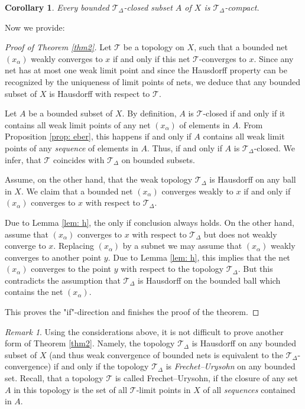 \documentclass[12pt,leqno]{amsart}
\numberwithin{equation}{section}
\newtheorem{cor}[thm]{Corollary}
\theoremstyle{remark}
\newtheorem{rem}[thm]{Remark}
\begin{document}
\begin{cor} \label{prop: comp}
	Every bounded $\mathcal T_{\Delta}$-closed subset $A$ of $X$ is $\mathcal T_{\Delta}$-compact. 	
\end{cor}

Now we provide:
\begin{proof}[Proof of Theorem \ref{thm2}]
	Let $\mathcal T$ be a topology on $X$, such that a bounded net $(x_{\alpha})$ weakly converges to $x$ if and only if this net $\mathcal T$-converges to $x$. Since any net has at most one weak limit point and since the Hausdorff property can be recognized by the uniqueness of limit points of nets, we deduce that any bounded subset of $X$ is Hausdorff with respect to $\mathcal T$. 
	
	 Let $A$ be a bounded subset of $X$. By definition, $A$ is $\mathcal T$-closed if and only if it contains all weak limit points of any net $(x_{\alpha})$ of elements in $A$. From 
	 Proposition \ref{prop: eber}, this happens if and only if $A$ contains all weak limit points of any \emph{sequence} of elements in $A$. Thus, if and only if $A$ is $\mathcal T_{\Delta}$-closed. We infer, that $\mathcal T$ coincides with $\mathcal T_{\Delta}$ on bounded subsets. 
	
	
	Assume, on the other hand, that the weak topology $\mathcal T_{\Delta}$ is Hausdorff on any ball in $X$. We claim that a bounded net $(x_{\alpha})$ converges weakly to $x$ if and only if $(x_{\alpha})$ converges to $x$ with respect to $\mathcal T_{\Delta}$. 
	
Due to Lemma \ref{lem: h}, the only if conclusion always holds.
On the other hand, assume that
$(x_{\alpha})$ converges to $x$ with respect to $\mathcal T_{\Delta}$ but does not weakly converge to $x$.
Replacing $(x_{\alpha})$ by a subnet we may assume that $(x_{\alpha})$ weakly converges to another point $y$. Due to Lemma \ref{lem: h}, this implies that the net $(x_{\alpha})$ converges to the point $y$ with respect to the topology $\mathcal T_{\Delta}$. But this contradicts the assumption that $\mathcal T_{\Delta}$ is Hausdorff on the bounded ball which contains the net $(x_{\alpha})$. 
	
This proves the "if"-direction and finishes the proof of the theorem.	
\end{proof}

\begin{rem}
Using the considerations above, it is not difficult to prove another form of Theorem \ref{thm2}.
Namely, the topology $\mathcal T_{\Delta}$ is Hausdorff on any bounded subset of $X$
(and thus weak convergence of bounded nets is equivalent to the $\mathcal T_{\Delta}$-convergence) if and only if the topology $\mathcal T_{\Delta}$ is \emph{Frechet--Urysohn} on any bounded set. Recall, that a topology $\mathcal T$ is called Frechet--Urysohn, if the closure of any set $A$ in this topology is the set of all $\mathcal T$-limit points in $X$ of all \emph{sequences} contained in $A$. 
\end{rem}
\end{document}

